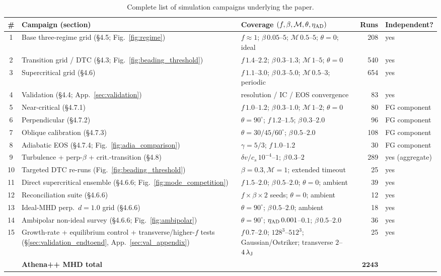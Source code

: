 \documentclass[usenatbib,twoside,twocolumn]{mnras}
\begin{document}
\begin{table}
\caption{Complete list of simulation campaigns underlying the paper.}
\label{tab:campaigns}
\begin{tabular}{cllrl}
\toprule
\# & Campaign (section) & Coverage $(f,\beta,\mathcal{M},\theta,\eta_{\rm AD})$ & Runs & Independent? \\
\midrule
1  & Base three-regime grid (\S4.5; Fig.~\ref{fig:regime}) & $f\approx1$; $\beta\,0.05$--$5$; $\mathcal{M}\,0.5$--$5$; $\theta=0$; ideal & 208 & yes \\
2  & Transition grid / DTC (\S4.3; Fig.~\ref{fig:beading_threshold}) & $f\,1.4$--$2.2$; $\beta\,0.3$--$1.3$; $\mathcal{M}\,1$--$5$; $\theta=0$ & 540 & yes \\
3  & Supercritical grid (\S4.6) & $f\,1.1$--$3.0$; $\beta\,0.3$--$5.0$; $\mathcal{M}\,0.5$--$3$; periodic & 654 & yes \\
4  & Validation (\S4.4; App.~\ref{sec:validation}) & resolution / IC / EOS convergence & 83 & yes \\
5  & Near-critical (\S4.7.1) & $f\,1.0$--$1.2$; $\beta\,0.3$--$1.0$; $\mathcal{M}\,1$--$2$; $\theta=0$ & 80 & FG component \\
6  & Perpendicular (\S4.7.2) & $\theta=90^\circ$; $f\,1.2$--$1.5$; $\beta\,0.3$--$2.0$ & 96 & FG component \\
7  & Oblique calibration (\S4.7.3) & $\theta=30/45/60^\circ$; $\beta\,0.5$--$2.0$ & 108 & FG component \\
8  & Adiabatic EOS (\S4.7.4; Fig.~\ref{fig:adia_comparison}) & $\gamma=5/3$; $f\,1.0$--$1.2$ & 30 & FG component \\
9  & Turbulence + perp-$\beta$ + crit.-transition (\S4.8) & $\delta v/c_s\,10^{-4}$--$1$; $\beta\,0.3$--$2$ & 289 & yes (aggregate) \\
10 & Targeted DTC re-runs (Fig.~\ref{fig:beading_threshold}) & $\beta=0.3,\mathcal{M}=1$; extended timeout & 25 & yes \\
11 & Direct supercritical ensemble (\S4.6.6; Fig.~\ref{fig:mode_competition}) & $f\,1.5$--$2.0$; $\beta\,0.5$--$2.0$; $\theta=0$; ambient & 39 & yes \\
12 & Reconciliation suite (\S4.6.6) & $f\times\beta\times2$ seeds; $\theta=0$; ambient & 12 & yes \\
13 & Ideal-MHD perp.\ $d=1.0$ grid (\S4.6.6) & $\theta=90^\circ$; $\beta\,0.5$--$2.0$; ambient & 18 & yes \\
14 & Ambipolar non-ideal survey (\S4.6.6; Fig.~\ref{fig:ambipolar}) & $\theta=90^\circ$; $\eta_{\rm AD}\,0.001$--$0.1$; $\beta\,0.5$--$2.0$ & 36 & yes \\
15 & Growth-rate + equilibrium control + transverse/higher-$f$ tests (\S\ref{sec:validation_endtoend}, App.~\ref{sec:val_appendix}) & $f\,0.7$--$2.0$; $128^3$--$512^3$; Gaussian/Ostriker; transverse $2$--$4\,\lambda_{\rm J}$ & 25 & yes \\
\midrule
   & \textbf{Athena++ MHD total} & & $\boldsymbol{2243}$ & \\
\bottomrule
\end{tabular}
\end{table}


\end{document}
